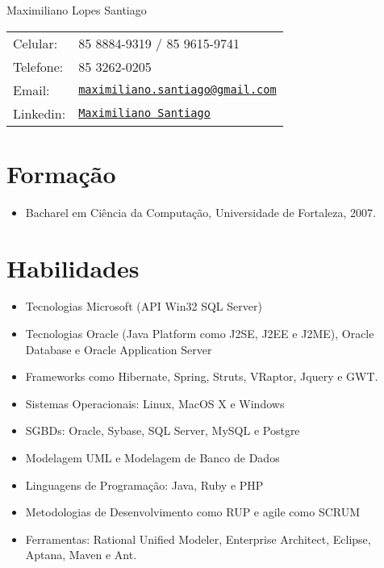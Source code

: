 \documentclass[letterpaper]{article}
\def\name{Maximiliano Lopes Santiago}
\begin{document}
\begin{flushright}

{\huge \name}


\vspace{0.25in}
\begin{minipage}{0.45\linewidth}
  \begin{tabular}{ll}
    Celular: & 85 8884-9319 / 85 9615-9741 \\
    Telefone: & 85 3262-0205 \\
    Email: & \href{mailto:maximiliano.santiago@gmail.com}{\tt maximiliano.santiago@gmail.com} \\
    Linkedin: & \href{http://www.linkedin.com/pub/maximiliano-santiago/a/145/b2a}{\tt Maximiliano Santiago} \\
  \end{tabular}
\end{minipage}
\end{flushright}

\section*{Formação}

\begin{itemize}
  \item Bacharel em Ciência da Computação, Universidade de Fortaleza, 2007.
\end{itemize}

\section*{Habilidades}
\begin{itemize}
  \item Tecnologias Microsoft (API Win32 SQL Server)
  \item Tecnologias Oracle (Java Platform como J2SE, J2EE e J2ME), Oracle Database e Oracle Application Server
  \item Frameworks como Hibernate, Spring, Struts, VRaptor, Jquery e GWT. 
  \item Sistemas Operacionais: Linux, MacOS X e Windows
  \item SGBDs: Oracle, Sybase, SQL Server, MySQL e Postgre
  \item Modelagem UML e Modelagem de Banco de Dados
  \item Linguagens de Programação: Java, Ruby e PHP
  \item Metodologias de Desenvolvimento como RUP e agile como SCRUM
  \item Ferramentas: Rational Unified Modeler, Enterprise Architect, Eclipse, Aptana, Maven e Ant.
\end{itemize}
\end{document}
